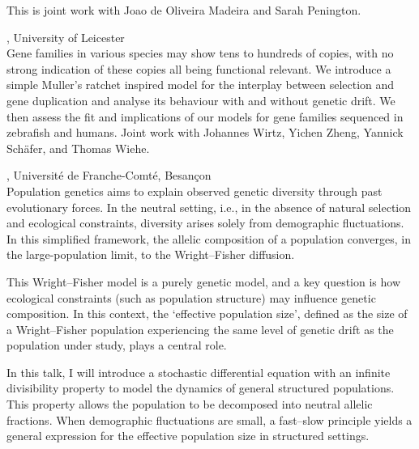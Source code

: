 \documentclass[12pt,a4paper]{article}
\begin{document}
 This is joint work with Joao de Oliveira Madeira and Sarah Penington. 

\bigskip\bigskip

, University of Leicester \\[2ex] Gene families in various species may show tens to hundreds of copies, with no strong indication of these copies all being functional relevant. We introduce a simple Muller's ratchet inspired model for the interplay between selection and gene duplication and analyse its behaviour with and without genetic drift. We then assess the fit and implications of our models for gene families sequenced in zebrafish and humans. Joint work with Johannes Wirtz, Yichen Zheng, Yannick Schäfer, and Thomas Wiehe. 

\bigskip\bigskip

, Université de Franche-Comté, Besançon \\[2ex] Population genetics aims to explain observed genetic diversity through past evolutionary forces. In the neutral setting, i.e., in the absence of natural selection and ecological constraints, diversity arises solely from demographic fluctuations. In this simplified framework, the allelic composition of a population converges, in the large-population limit, to the Wright–Fisher diffusion. 

 This Wright–Fisher model is a purely genetic model, and a key question is how ecological constraints (such as population structure) may influence genetic composition. In this context, the ‘effective population size’, defined as the size of a Wright–Fisher population experiencing the same level of genetic drift as the population under study, plays a central role. 

 In this talk, I will introduce a stochastic differential equation with an infinite divisibility property to model the dynamics of general structured populations. This property allows the population to be decomposed into neutral allelic fractions. When demographic fluctuations are small, a fast–slow principle yields a general expression for the effective population size in structured settings. 
\end{document}

